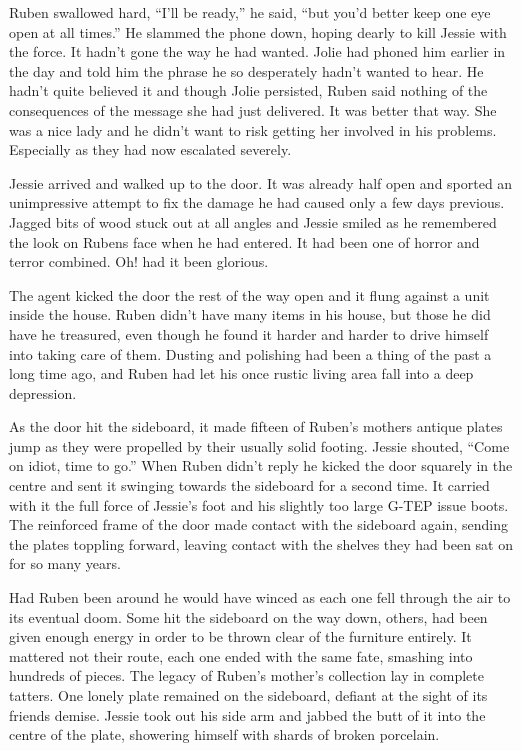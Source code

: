 Ruben swallowed hard, ``I'll be ready,'' he said, ``but you'd better keep one eye open at all times.''  He slammed the phone down, hoping dearly to kill Jessie with the force.  It hadn't gone the way he had wanted.  Jolie had phoned him earlier in the day and told him the phrase he so desperately hadn't wanted to hear.  He hadn't quite believed it and though Jolie persisted, Ruben said nothing of the consequences of the message she had just delivered.  It was better that way.  She was a nice lady and he didn't want to risk getting her involved in his problems.  Especially as they had now escalated severely.



\thoughtbreak



Jessie arrived and walked up to the door.  It was already half open and sported an unimpressive attempt to fix the damage he had caused only a few days previous.  Jagged bits of wood stuck out at all angles and Jessie smiled as he remembered the look on Rubens face when he had entered.  It had been one of horror and terror combined.  Oh! had it been glorious.  

The agent kicked the door the rest of the way open and it flung against a unit inside the house.  Ruben didn't have many items in his house, but those he did have he treasured, even though he found it harder and harder to drive himself into taking care of them.  Dusting and polishing had been a thing of the past a long time ago, and Ruben had let his once rustic living area fall into a deep depression.

As the door hit the sideboard, it made fifteen of Ruben's mothers antique plates jump as they were propelled by their usually solid footing.  Jessie shouted, ``Come on idiot, time to go.''  When Ruben didn't reply he kicked the door squarely in the centre and sent it swinging towards the sideboard for a second time.  It carried with it the full force of Jessie's foot and his slightly too large G-TEP issue boots.  The reinforced frame of the door made contact with the sideboard again, sending the plates toppling forward, leaving contact with the shelves they had been sat on for so many years.

Had Ruben been around he would have winced as each one fell through the air to its eventual doom.  Some hit the sideboard on the way down, others, had been given enough energy in order to be thrown clear of the furniture entirely.  It mattered not their route, each one ended with the same fate, smashing into hundreds of pieces.  The legacy of Ruben's mother's collection lay in complete tatters.  One lonely plate remained on the sideboard, defiant at the sight of its friends demise.  Jessie took out his side arm and jabbed the butt of it into the centre of the plate, showering himself with shards of broken porcelain.

